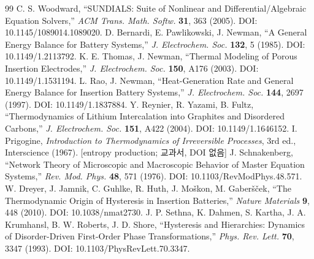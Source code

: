\documentclass[11pt,a4paper]{article}
\newcommand{\brk}{\discretionary{}{}{}}%
\begin{document}
\begin{thebibliography}{99}
  C. S. Woodward, ``SUNDIALS: Suite of Nonlinear and Differential/Algebraic Equation Solvers,''
  \emph{ACM Trans. Math. Softw.} \textbf{31}, 363 (2005). DOI: 10.1145/\brk 1089014.1089020.
 D. Bernardi, E. Pawlikowski, J. Newman, ``A General Energy Balance for Battery
  Systems,'' \emph{J. Electrochem. Soc.} \textbf{132}, 5 (1985). DOI: 10.1149/\brk 1.2113792.
 K. E. Thomas, J. Newman, ``Thermal Modeling of Porous Insertion Electrodes,''
  \emph{J. Electrochem. Soc.} \textbf{150}, A176 (2003). DOI: 10.1149/\brk 1.1531194.
 L. Rao, J. Newman, ``Heat-Generation Rate and General Energy Balance for Insertion
  Battery Systems,'' \emph{J. Electrochem. Soc.} \textbf{144}, 2697 (1997). DOI: 10.1149/1.1837884.
 Y. Reynier, R. Yazami, B. Fultz, ``Thermodynamics of Lithium Intercalation into
  Graphites and Disordered Carbons,'' \emph{J. Electrochem. Soc.} \textbf{151}, A422 (2004).
  DOI: 10.1149/1.1646152.
 I. Prigogine, \emph{Introduction to Thermodynamics of Irreversible Processes},
  3rd ed., Interscience (1967). [entropy production; 교과서, DOI 없음]
 J. Schnakenberg, ``Network Theory of Microscopic and Macroscopic Behavior of
  Master Equation Systems,'' \emph{Rev. Mod. Phys.} \textbf{48}, 571 (1976). DOI: 10.1103/\brk RevModPhys.48.571.
 W. Dreyer, J. Jamnik, C. Guhlke, R. Huth, J. Mo\v{s}kon, M. Gaber\v{s}\v{c}ek,
  ``The Thermodynamic Origin of Hysteresis in Insertion Batteries,'' \emph{Nature Materials} \textbf{9},
  448 (2010). DOI: 10.1038/\brk nmat2730.
 J. P. Sethna, K. Dahmen, S. Kartha, J. A. Krumhansl, B. W. Roberts, J. D. Shore,
  ``Hysteresis and Hierarchies: Dynamics of Disorder-Driven First-Order Phase Transformations,''
  \emph{Phys. Rev. Lett.} \textbf{70}, 3347 (1993). DOI: 10.1103/\brk PhysRevLett.70.3347.
\end{thebibliography}
\end{document}
